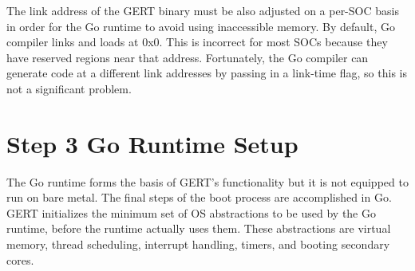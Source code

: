 The link address of the GERT binary must be also adjusted on a per-SOC basis in order for the Go
runtime to avoid using inaccessible memory. By default, Go compiler links and loads at 0x0. This is incorrect
for most SOCs because they have reserved regions near that address. Fortunately, the Go compiler can
generate code at a different link addresses by passing in a link-time flag, so this is not a significant problem.



\section{Step 3 Go Runtime Setup}

The Go runtime forms the basis of GERT's functionality but it is not equipped to
run on bare metal. The final steps of the boot process are accomplished in Go. GERT
initializes the minimum set of OS abstractions
to be used by the Go runtime, before the runtime actually uses them. These abstractions are
virtual memory, thread scheduling, interrupt handling, timers, and booting secondary cores.



